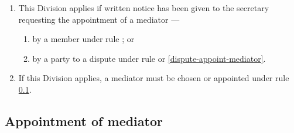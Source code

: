 \documentclass[../constitution.tex]{subfiles}
\begin{document}
\begin{enumerate}

\item This Division  applies if written notice has been given to the secretary requesting the appointment of a mediator ---

  \begin{enumerate}
  
  \item by a member under rule ; or
  \item by a party to a dispute under rule  or \ref{dispute-appoint-mediator}.
  \end{enumerate}
\item If this Division  applies, a mediator must be chosen or appointed under rule \ref{appointment-of-mediator}.
\end{enumerate}

\hypertarget{appointment-of-mediator-1}{%
\subsection{Appointment of mediator}\label{appointment-of-mediator}}
\end{document}
